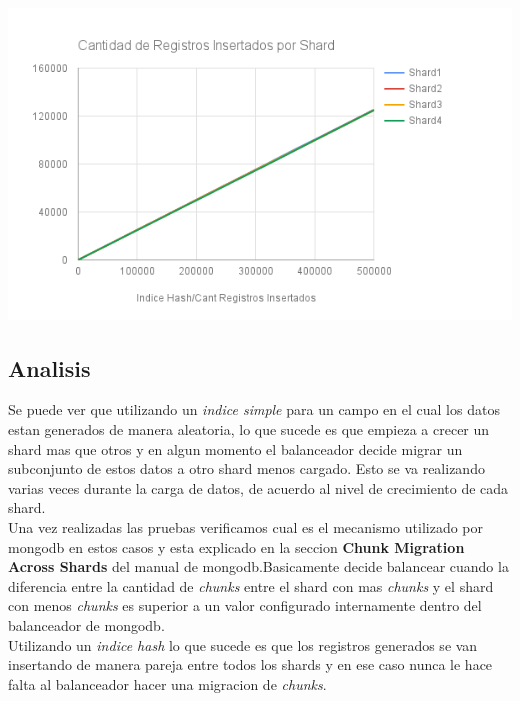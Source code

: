  \includegraphics[width=\linewidth]{IndiceHashChart.png}
 
\pagebreak
\subsection{Analisis}

Se puede ver que  utilizando un \textit{indice simple} para un campo en el cual los datos estan generados de manera aleatoria, lo que sucede es que empieza a crecer un shard mas que otros y en algun momento el balanceador decide migrar un subconjunto de estos datos a otro shard menos cargado. Esto se va realizando varias veces durante la carga de datos, de acuerdo al nivel de crecimiento de cada shard.\\
Una vez realizadas las pruebas verificamos cual es el mecanismo utilizado por mongodb en estos casos y esta explicado en la seccion \textbf{Chunk Migration Across Shards} del manual de mongodb.Basicamente decide balancear cuando la diferencia entre la cantidad de \textit{chunks} entre el shard con mas \textit{chunks}  y el shard con menos \textit{chunks} es superior a un valor configurado internamente dentro del balanceador de mongodb.\\
Utilizando un \textit{indice hash} lo que sucede es que los registros generados se van insertando de manera pareja entre todos los shards y en ese caso nunca le hace falta al balanceador hacer una migracion de \textit{chunks}.
